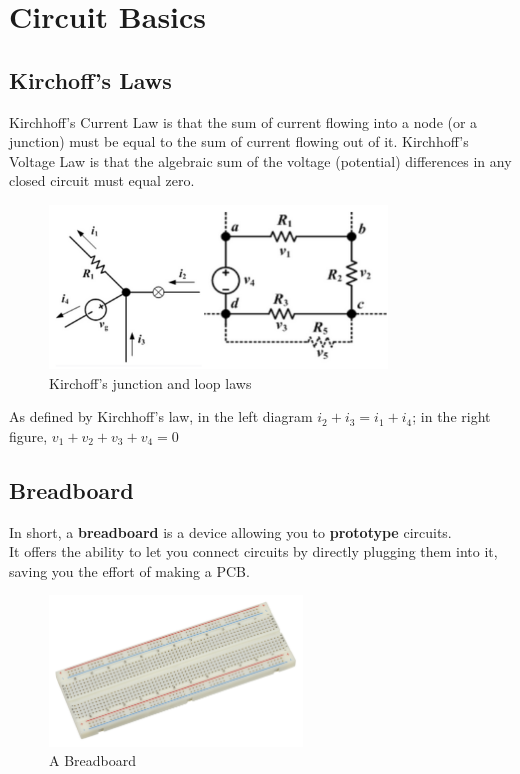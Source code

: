 \documentclass{article}
\begin{document}
\section{Circuit Basics}

\subsection{Kirchoff's Laws}
Kirchhoff's Current Law is that the sum of current flowing into a node (or a junction) must be equal to the sum of current flowing out of it.
Kirchhoff’s Voltage Law is that the algebraic sum of the voltage (potential) differences in any closed circuit must equal zero.

\begin{figure} [h]
    \centering
    \includegraphics[width=0.8\textwidth]{img/Kirchoff.png}
    \caption{Kirchoff's junction and loop laws}
    \label{fig:Kirchoff}
\end{figure}

As defined by Kirchhoff’s law, in the left diagram $i_{2} + i_{3} = i_{1} + i_{4}$; in the right figure,
$v_{1} + v_{2} + v_{3} + v_{4} = 0$

\subsection{Breadboard}
In short, a \textbf{breadboard} is a device allowing you to \textbf{prototype} circuits. \\

It offers the ability to let you connect circuits by directly plugging them into it, saving you the effort of making a PCB.

\begin{figure} [h]
    \centering
    \includegraphics[width=0.6\textwidth]{img/Electronics-White-Breadboard.jpg}
    \caption{A Breadboard}
    \label{fig:breadboard}
\end{figure}
\end{document}

